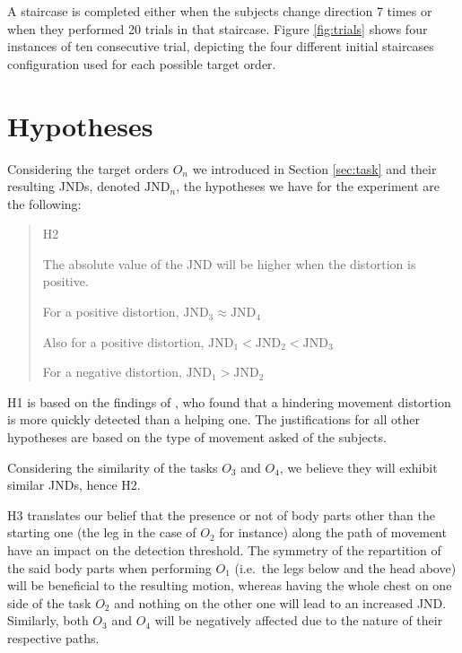 A staircase is completed either when the subjects change direction 7 times or when they performed 20 trials in that staircase. Figure \ref{fig:trials} shows four instances of ten consecutive trial, depicting the four different initial staircases configuration used for each possible target order.

\section{Hypotheses}

Considering the target orders $O_n$  we introduced in Section \ref{sec:task} and their resulting JNDs, denoted $\text{JND}_n$, the hypotheses we have for the experiment are the following:

\begin{quote}
    \begin{labeling}[:]{H2}
      \item [H1] The absolute value of the JND will be higher when the distortion is positive.
      \item [H2] For a positive distortion, $\text{JND}_3 \approx \text{JND}_4$
      \item [H3] Also for a positive distortion, $\text{JND}_1 < \text{JND}_2 < \text{JND}_3$
      \item [H4] For a negative distortion, $\text{JND}_1 > \text{JND}_2$
    \end{labeling}
\end{quote}

H1 is based on the findings of \cite{debarba2017embodiment}, who found that a hindering movement distortion is more quickly detected than a helping one. The justifications for all other hypotheses are based on the type of movement asked of the subjects.

Considering the similarity of the tasks $O_3$ and $O_4$, we believe they will exhibit similar JNDs, hence H2.

H3 translates our belief that the presence or not of body parts other than the starting one (the leg in the case of $O_2$ for instance) along the path of movement have an impact on the detection threshold. The symmetry of the repartition of the said body parts when performing $O_1$ (i.e.\ the legs below and the head above) will be beneficial to the resulting motion, whereas having the whole chest on one side of the task $O_2$ and nothing on the other one will lead to an increased JND. Similarly, both $O_3$ and $O_4$ will be negatively affected due to the nature of their respective paths. \cite{burns2007macbeth}


